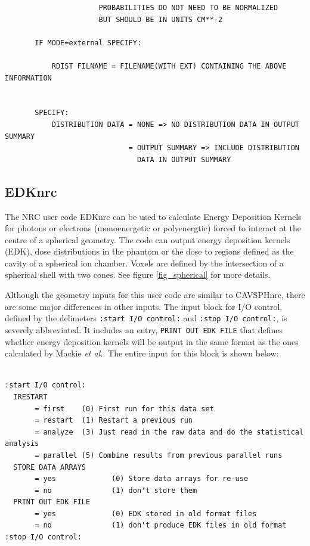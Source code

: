\documentclass[12pt,twoside]{article}  %
\begin{document}
\begin{verbatim}
                      PROBABILITIES DO NOT NEED TO BE NORMALIZED
                      BUT SHOULD BE IN UNITS CM**-2

       IF MODE=external SPECIFY:

           RDIST FILNAME = FILENAME(WITH EXT) CONTAINING THE ABOVE INFORMATION


       SPECIFY:
           DISTRIBUTION DATA = NONE => NO DISTRIBUTION DATA IN OUTPUT SUMMARY
                             = OUTPUT SUMMARY => INCLUDE DISTRIBUTION
                               DATA IN OUTPUT SUMMARY
\end{verbatim}

\subsection{EDKnrc}

The NRC user code EDKnrc can be used to calculate Energy Deposition Kernels
for photons or electrons (monoenergetic or polyenergtic) forced to interact
at the centre of a spherical
geometry\cite{Ma05}.  The code can output energy deposition kernels (EDK),
dose distributions in the phantom or the dose to regions defined as the
cavity of a spherical ion chamber.  Voxels are defined by the intersection
of a spherical shell with two cones. See figure \ref{fig_spherical}
for more details.

Although the geometry inputs for this user code are similar to CAVSPHnrc,
there are some major differences in other inputs. The input block for I/O
control, defined by the delimeters {\tt :start I/O control:} and
{\tt:stop I/O control:}, is severely abbreviated.  It includes an entry,
{\tt PRINT OUT EDK FILE} that defines whether energy deposition
kernels will be output in the same format as the ones calculated by
Mackie {\it et al.}\cite{Ma88}. The entire input for this block
is shown below:

\begin{verbatim}

:start I/O control:
  IRESTART
       = first    (0) First run for this data set
       = restart  (1) Restart a previous run
       = analyze  (3) Just read in the raw data and do the statistical analysis
       = parallel (5) Combine results from previous parallel runs
  STORE DATA ARRAYS
       = yes             (0) Store data arrays for re-use
       = no              (1) don't store them
  PRINT OUT EDK FILE
       = yes             (0) EDK stored in old format files
       = no              (1) don't produce EDK files in old format
:stop I/O control:
\end{verbatim}
\end{document}
